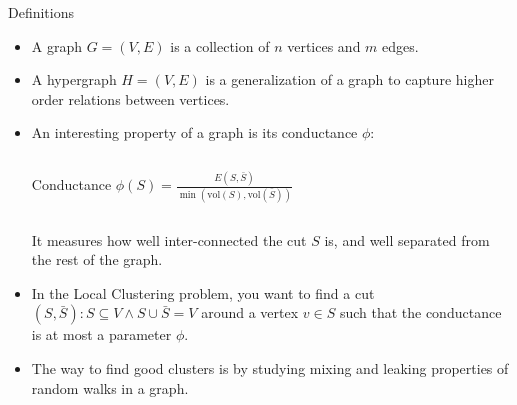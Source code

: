 \documentclass[../main.tex]{subfiles}
\begin{document}
    \begin{frame}{Definitions} 
        \begin{itemize}
            \item A graph $G=(V,E)$ is a collection of $n$ vertices and $m$ edges.
            \item A hypergraph $H=(V,E)$ is a generalization of a graph to capture higher order relations between vertices.
            \item An interesting property of a graph is its conductance $\phi$: 
	            \begin{columns}
	            	\begin{block}{Conductance}
	            		$\phi(S) = \frac{E(S, \bar{S})}{\min(\text{vol}(S), \text{vol}(\bar{S}))}$
	            	\end{block}
	            \end{columns}
            It measures how well inter-connected the cut $S$ is, and well separated from the rest of the graph.
            \item In the Local Clustering problem, you want to find a cut $(S, \bar{S}) : S\subseteq V \land S\cup \bar{S}=V$ around a vertex $v\in S$ such that the conductance is at most a parameter $\phi$.
            \item The way to find good clusters is by studying mixing and leaking properties of random walks in a graph. 
        \end{itemize}
    \end{frame}
    
\end{document}
